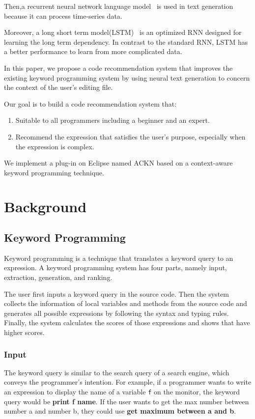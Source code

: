 \documentclass[PRO,english]{ipsj}
\begin{document}
Then,a recurrent neural network language model~\cite{RNN} is used in text generation because it can process time-series data.

Moreover, a long short term model(LSTM)~\cite{LSTM} is an optimized RNN designed for learning the long term dependency. In contrast to the standard RNN, LSTM has a better performance to learn from more complicated data.
		
In this paper, we propose a code recommendation system that improves the existing keyword programming system by using neural text generation to concern the context of the user’s editing file.

Our goal is to build a code recommendation system that:
\begin{enumerate}
\item Suitable to all programmers including a beginner and an expert.
\item Recommend the expression that satisfies the user’s purpose, especially when the expression is complex.
\end{enumerate}

We implement a plug-in on Eclipse named ACKN based on a context-aware keyword programming technique. 

\section{Background}
\subsection{Keyword Programming}
Keyword programming is a technique that translates a keyword query to an expression. A keyword programming system has four parts, namely input, extraction, generation, and ranking. 

The user first inputs a keyword query in the source code. Then the system collects the information of local variables and methods from the source code and generates all possible expressions by following the syntax and typing rules. Finally, the system calculates the scores of those expressions and shows that have higher scores.
\subsubsection{Input}
The keyword query is similar to the search query of a search engine, which conveys the programmer’s intention. For example, if a programmer wants to write an expression to display the name of a variable \texttt{f} on the monitor, the keyword query would be \textbf{print f name}. If the user wants to get the max number between number a and number b, they could use \textbf{get maximum between a and b}.
\end{document}
